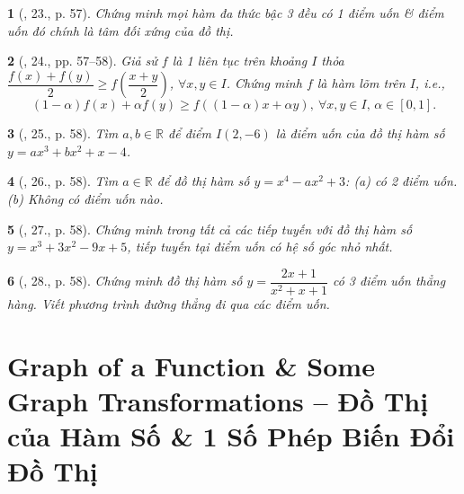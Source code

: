 \documentclass{article}
\newtheorem{baitoan}{}
\begin{document}
\begin{baitoan}[\cite{TLCT_BT_dai_so_giai_tich_11}, 23., p. 57]
	Chứng minh mọi hàm đa thức bậc 3 đều có 1 điểm uốn \& điểm uốn đó chính là tâm đối xứng của đồ thị.
\end{baitoan}

\begin{baitoan}[\cite{TLCT_BT_dai_so_giai_tich_11}, 24., pp. 57--58]
	Giả sử $f$ là 1 liên tục trên khoảng $I$ thỏa $\dfrac{f(x) + f(y)}{2}\ge f\left(\dfrac{x + y}{2}\right)$, $\forall x,y\in I$. Chứng minh $f$ là hàm lõm trên $I$, i.e.,
	\begin{equation}
		(1 - \alpha)f(x) + \alpha f(y)\ge f((1 - \alpha)x + \alpha y),\ \forall x,y\in I,\,\alpha\in[0,1].
	\end{equation}
\end{baitoan}

\begin{baitoan}[\cite{TLCT_BT_dai_so_giai_tich_11}, 25., p. 58]
	Tìm $a,b\in\mathbb{R}$ để điểm $I(2,-6)$ là điểm uốn của đồ thị hàm số $y = ax^3 + bx^2 + x - 4$.
\end{baitoan}

\begin{baitoan}[\cite{TLCT_BT_dai_so_giai_tich_11}, 26., p. 58]
	Tìm $a\in\mathbb{R}$ để đồ thị hàm số $y = x^4 - ax^2 + 3$: (a) có 2 điểm uốn. (b) Không có điểm uốn nào.
\end{baitoan}

\begin{baitoan}[\cite{TLCT_BT_dai_so_giai_tich_11}, 27., p. 58]
	Chứng minh trong tất cả các tiếp tuyến với đồ thị hàm số $y = x^3 + 3x^2 - 9x + 5$, tiếp tuyến tại điểm uốn có hệ số góc nhỏ nhất.
\end{baitoan}

\begin{baitoan}[\cite{TLCT_BT_dai_so_giai_tich_11}, 28., p. 58]
	Chứng minh đồ thị hàm số $y = \dfrac{2x + 1}{x^2 + x + 1}$ có 3 điểm uốn thẳng hàng. Viết phương trình đường thẳng đi qua các điểm uốn.
\end{baitoan}


\section{Graph of a Function \& Some Graph Transformations -- Đồ Thị của Hàm Số \& 1 Số Phép Biến Đổi Đồ Thị}
\end{document}
